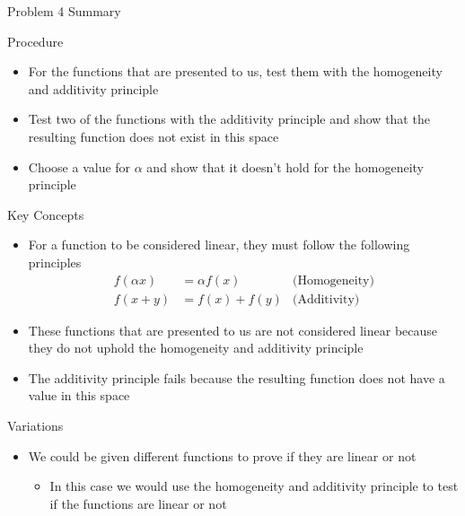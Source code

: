 \begin{summary}{Problem 4 Summary}
    \begin{statement}{Procedure}
        \begin{itemize}
            \item For the functions that are presented to us, test them with the homogeneity and additivity principle
            \item Test two of the functions with the additivity principle and show that the resulting function does not exist in this space
            \item Choose a value for $\alpha$ and show that it doesn't hold for the homogeneity principle
        \end{itemize}
    \end{statement}
    \begin{statement}{Key Concepts}
        \begin{itemize}
            \item For a function to be considered linear, they must follow the following principles
            \begin{align*}
                f(\alpha x) & = \alpha f(x) & \text{(Homogeneity)} \\
                f(x + y) & = f(x) + f(y) & \text{(Additivity)}
            \end{align*}
            \item These functions that are presented to us are not considered linear because they do not uphold the homogeneity and additivity principle
            \item The additivity principle fails because the resulting function does not have a value in this space
        \end{itemize}
    \end{statement}
    \begin{statement}{Variations}
        \begin{itemize}
            \item We could be given different functions to prove if they are linear or not
            \begin{itemize}
                \item In this case we would use the homogeneity and additivity principle to test if the functions are linear or not
            \end{itemize}
        \end{itemize}
    \end{statement}
\end{summary}

